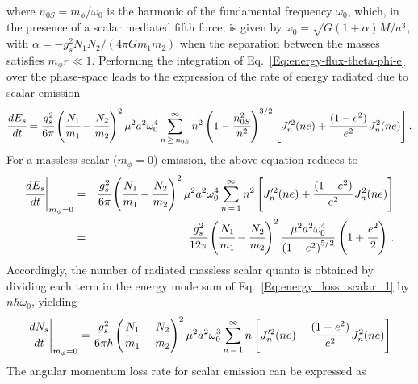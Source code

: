 \documentclass[aps,prd]{revtex4-2}
\begin{document}
where $n_{0S} = m_{\phi}/\omega_{0}$ is the harmonic of the fundamental frequency $\omega_0$, which, in the presence of a scalar mediated fifth force, is given by $\omega_0=\sqrt{G(1+\alpha)M/a^3}$, with $\alpha=- g_s^2 N_1 N_2/(4 \pi G m_1 m_2)$ when the separation between the masses satisfies $m_\phi r \ll 1$.  Performing the integration of Eq.~\eqref{Eq:energy-flux-theta-phi-e} over the phase-space leads to the expression of the rate of energy radiated due to scalar emission
\begin{eqnarray}\label{dES}
    \cfrac{dE_{s}}{dt} = \cfrac{g_{s}^2}{6\pi} \left(\cfrac{N_{1}}{m_{1}}-\cfrac{N_{2}}{m_{2}}\right)^2 \mu^2 a^2 \omega_{0}^4 \sum_{n\,\geq\, n_{0S}}^{\infty} n^{2} \left(1 - \cfrac{n_{0S}^{2}}{n^2} \right)^{3/2} \left[ J^{\prime 2}_{n}(ne) + \cfrac{(1-e^{2})}{e^{2}}\,J^{2}_{n}(ne) \right].
\end{eqnarray}
For a massless scalar ($m_{\phi} = 0$) emission, the above equation reduces to
\begin{eqnarray}\label{Eq:energy_loss_scalar_1}
    \cfrac{dE_{s}}{dt}\Bigg|_{m_{\phi}=0} &=& \cfrac{g_{s}^{2}}{6\pi} \left( \cfrac{N_{1}}{m_{1}} - \cfrac{N_{2}}{m_{2}} \right)^{2} \mu^{2} a^{2} \omega_{0}^{4} 
    \sum_{n\, =\, 1}^{\infty}n^{2} \left[J^{\prime 2}_{n}(ne) + \cfrac{(1-e^{2})}{e^{2}}\,J^{2}_{n}(ne) \right] \nonumber \\ 
    &=& \cfrac{g_{s}^{2}}{12\pi} \left( \cfrac{N_{1}}{m_{1}} - \cfrac{N_{2}}{m_{2}} \right)^{2}\cfrac{\mu^{2} a^{2} \omega_{0}^{4}}{\left(1-e^2\right)^{5/2}}\,\left(1+\cfrac{e^2}{2}\right)\,.
\end{eqnarray}
Accordingly, the number of radiated massless scalar quanta is obtained by dividing each term in the energy mode sum of Eq.~\eqref{Eq:energy_loss_scalar_1} by $n \hbar \omega_0$, yielding
\begin{eqnarray}\label{Eq:Rate_number_loss_Scalar}
    \cfrac{dN_{s}}{dt}\Bigg|_{m_{\phi}=0} 
    =  \cfrac{g_{s}^2}{6\pi\hbar} \left(\cfrac{N_{1}}{m_{1}}-\cfrac{N_{2}}{m_{2}}\right)^2 \mu^2 a^2 \omega_{0}^3 \sum_{n\,=\,1}^{\infty} n \left[J^{\prime 2}_{n}(ne) + \cfrac{(1-e^{2})}{e^{2}}\,J^{2}_{n}(ne) \right]
\end{eqnarray}
The angular momentum loss rate for scalar emission can be expressed as
\end{document}
